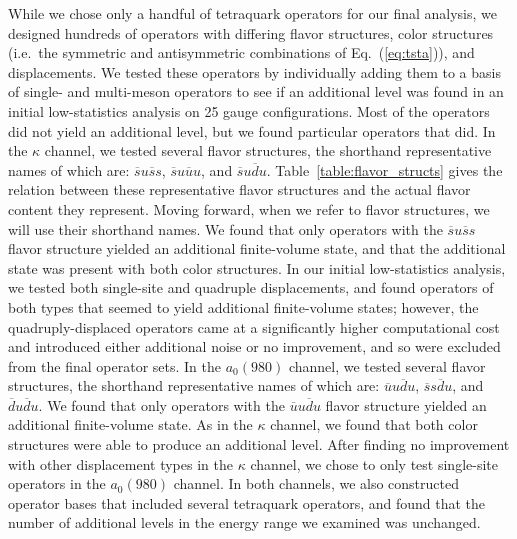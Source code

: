 While we chose only a handful of tetraquark operators for our final analysis, we designed hundreds of operators with differing flavor structures, color structures (i.e.\ the symmetric and antisymmetric combinations of Eq.~(\ref{eq:tsta})), and displacements. We tested these operators by individually adding them to a basis of single- and multi-meson operators to see if an additional level was found in an initial low-statistics analysis on 25 gauge configurations. Most of the operators did not yield an additional level, but we found particular operators that did. In the $\kappa$ channel, we tested several flavor structures, the shorthand representative names of which are: $\overline s u \overline s s$, $\overline s u \overline u u$, and $\overline s u \overline d u$. Table~\ref{table:flavor_structs} gives the relation between these representative flavor structures and the actual flavor content they represent. Moving forward, when we refer to flavor structures, we will use their shorthand names. We found that only operators with the $\overline s u \overline s s$ flavor structure yielded an additional finite-volume state, and that the additional state was present with both color structures. In our initial low-statistics analysis, we tested both single-site and quadruple displacements, and found operators of both types that seemed to yield additional finite-volume states; however, the quadruply-displaced operators came at a significantly higher computational cost and introduced either additional noise or no improvement, and so were excluded from the final operator sets. In the $a_0(980)$ channel, we tested several flavor structures, the shorthand representative names of which are: $\overline u u \overline d u$, $\overline s s \overline d u$, and $\overline d u \overline d u$. We found that only operators with the $\overline u u \overline d u$ flavor structure yielded an additional finite-volume state. As in the $\kappa$ channel, we found that both color structures were able to produce an additional level. After finding no improvement with other displacement types in the $\kappa$ channel, we chose to only test single-site operators in the $a_0(980)$ channel. In both channels, we also constructed operator bases that included several tetraquark operators, and found that the number of additional levels in the energy range we examined was unchanged.

